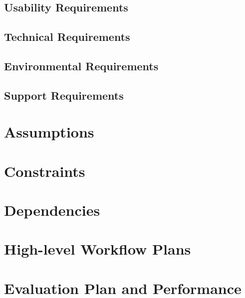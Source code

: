 \documentclass[11pt, oneside]{article}
\begin{document}
\subsection{Usability Requirements}
\subsection{Technical Requirements}
\subsection{Environmental Requirements}
\subsection{Support Requirements}
\section{Assumptions}
\section{Constraints}
\section{Dependencies}
\section{High-level Workflow Plans}
\section{Evaluation Plan and Performance}
\end{document}
